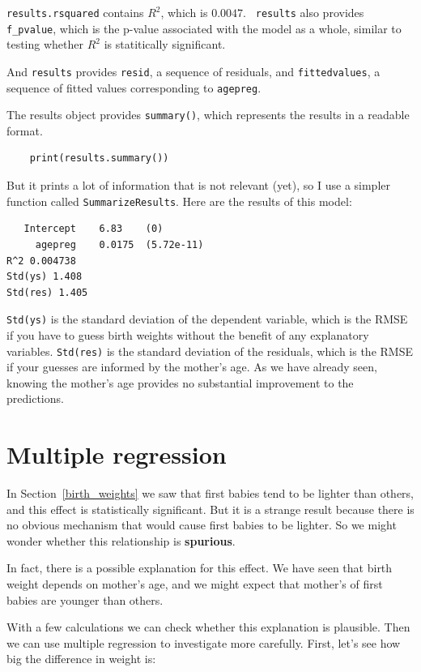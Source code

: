\documentclass[12pt]{book}
\begin{document}
{\tt results.rsquared} contains $R^2$, which is $0.0047$.  {\tt
  results} also provides \verb"f_pvalue", which is the p-value
associated with the model as a whole, similar to testing whether $R^2$
is statitically significant.

And {\tt results} provides {\tt resid}, a sequence of residuals, and
{\tt fittedvalues}, a sequence of fitted values corresponding to
{\tt agepreg}.

The results object provides {\tt summary()}, which
represents the results in a readable format.  

\begin{verbatim}
    print(results.summary())
\end{verbatim}

But it prints a lot of information that is not relevant (yet), so
I use a simpler function called {\tt SummarizeResults}.  Here are
the results of this model:

\begin{verbatim}
   Intercept	6.83	(0)
     agepreg	0.0175	(5.72e-11)
R^2 0.004738
Std(ys) 1.408
Std(res) 1.405
\end{verbatim}

{\tt Std(ys)} is the standard deviation of the dependent variable,
which is the RMSE if you have to guess birth weights without the benefit of
any explanatory variables.  {\tt Std(res)} is the standard deviation
of the residuals, which is the RMSE if your guesses are informed
by the mother's age.  As we have already seen, knowing the mother's
age provides no substantial improvement to the predictions.


\section{Multiple regression}

In Section~\ref{birth_weights} we saw that first babies tend to be
lighter than others, and this effect is statistically significant.
But it is a strange result because there is no obvious mechanism that
would cause first babies to be lighter.  So we might wonder whether
this relationship is {\bf spurious}.

In fact, there is a possible explanation for this effect.  We have
seen that birth weight depends on mother's age, and we might expect
that mother's of first babies are younger than others.

With a few calculations we can check whether this explanation
is plausible.  Then we can use multiple regression to investigate
more carefully.  First, let's see how big the difference in weight
is:
\end{document}
